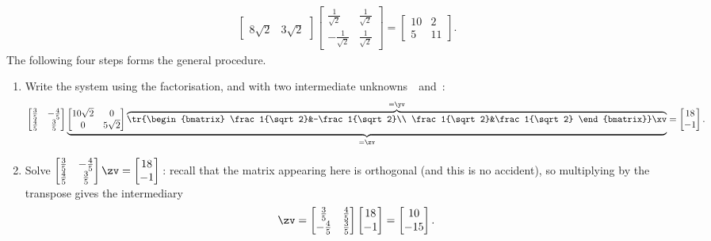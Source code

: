 \begin{example}
\begin{solution}
\begin{eqnarray*}
\begin{bmatrix}
\\ 8{\sqrt2}&3{\sqrt2} \end{bmatrix}
\begin{bmatrix} \frac1{\sqrt2}&\frac1{\sqrt2}\\ -\frac1{\sqrt2}&\frac1{\sqrt2} \end{bmatrix}
=\begin{bmatrix} 10&2\\5&11 \end{bmatrix}.
\end{eqnarray*}
The following four steps forms the general procedure. 
\begin{enumerate}
\item Write the system using the factorisation, and with two intermediate unknowns~\yv\ and~\zv:
\begin{equation*}
\begin{bmatrix} \frac35&-\frac45\\\frac45&\frac35 \end{bmatrix}
\underbrace{\begin{bmatrix} 10\sqrt2&0\\0&5\sqrt2 \end{bmatrix}
\overbrace{\tr{\begin{bmatrix} \frac1{\sqrt2}&-\frac1{\sqrt2}\\ \frac1{\sqrt2}&\frac1{\sqrt2} \end{bmatrix}}\xv}^{=\yv}}_{=\zv}=\begin{bmatrix} 18\\-1 \end{bmatrix}.
\end{equation*}

\item Solve \(\begin{bmatrix} \frac35&-\frac45\\\frac45&\frac35 \end{bmatrix}\zv=\begin{bmatrix} 18\\-1 \end{bmatrix}\)\,: recall that the matrix appearing here is orthogonal (and this is no accident), so multiplying by the transpose gives the intermediary
\begin{equation*}
\zv=\begin{bmatrix} \frac35&\frac45\\-\frac45&\frac35 \end{bmatrix}
\begin{bmatrix} 18\\-1 \end{bmatrix}
=\begin{bmatrix} 10\\-15 \end{bmatrix}.
\end{equation*}


\end{enumerate}
\end{solution}
\end{example}
